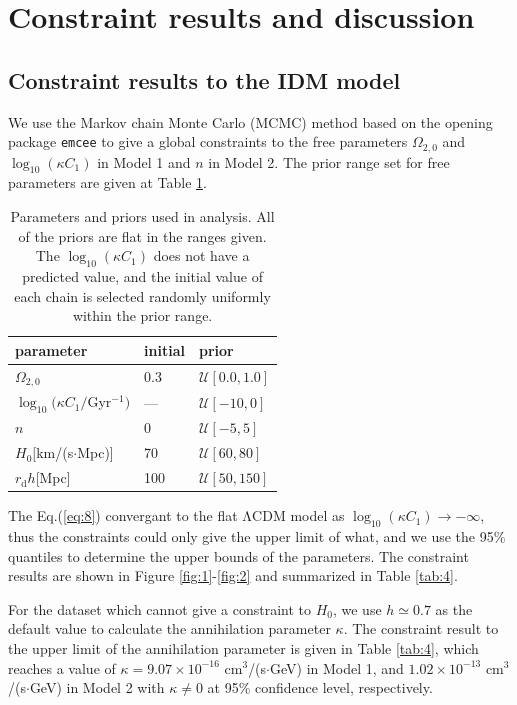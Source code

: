 \documentclass[twocolumn]{aastex631}
\begin{document}
\section{Constraint results and discussion}\label{sec:4}

\subsection{Constraint results to the IDM model}

   We use the Markov chain Monte Carlo (MCMC) method based 
   on the opening package \texttt{emcee} to give a global constraints
   to the free parameters $\Omega_{2,0}$ and $\log_{10}(\kappa C_1)$ in 
   Model 1 and $n$ in Model 2.
   The prior range set for free parameters are given at Table \ref{tab:3}.

   \begin{table}
      \centering
      \begin{tabular}{lll}
         \hline\hline
         parameter & initial & prior \\
         \hline
         $\Omega_{2,0}$ & 0.3 & $\mathcal{U}[0.0,1.0]$ \\
         $\log_{10}(\kappa C_1/$Gyr${}^{-1})$ & --- & $\mathcal{U}[-10,0]$ \\
         $n$ & 0 & $\mathcal{U}[-5,5]$ \\
         \hline
         $H_0$[km/(s$\cdot$Mpc)] & 70 & $\mathcal{U}[60,80]$ \\
         $r_{\text{d}}h$[Mpc] & 100 & $\mathcal{U}[50,150]$ \\
         \hline
      \end{tabular}
      \caption{
         Parameters and priors used in analysis. 
         All of the priors are flat in the ranges given. 
         The $\log_{10}(\kappa C_1)$ does not have a predicted value, 
         and the initial value of each chain is selected randomly uniformly
         within the prior range.
      }
      \label{tab:3}
   \end{table}

   The Eq.(\ref{eq:8}) convergant to the flat ΛCDM model as
   $\log_{10}(\kappa C_1)\to-\infty$, thus the constraints
   could only give the upper limit of what, and we use the
   95\% quantiles to determine the upper bounds of the parameters. 
   The constraint results are shown in 
   Figure \ref{fig:1}-\ref{fig:2} and summarized in Table \ref{tab:4}.

   For the dataset which cannot give a constraint to $H_0$, 
   we use $h \simeq 0.7$ as the default value to calculate the 
   annihilation parameter $\kappa$.
   The constraint result to the upper limit of the annihilation parameter 
   is given in Table \ref{tab:4}, which reaches a value of $\kappa = 9.07 \times 10^{-16}$ cm${}^3$/(s$\cdot$GeV) in Model 1, 
   and $1.02 \times 10^{-13}$ cm${}^3$/(s$\cdot$GeV) in Model 2 with $\kappa\neq0$ at 95\% confidence level, respectively.
\end{document}
